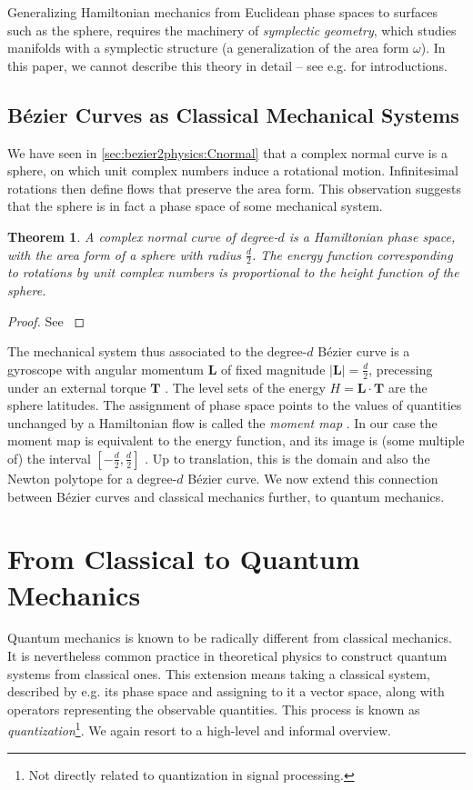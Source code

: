 \documentclass[final,3p,mathptmx]{elsarticle}
\newtheorem{theorem}{Theorem}
\begin{document}
Generalizing Hamiltonian mechanics from Euclidean phase spaces to surfaces such as the sphere, requires the machinery of \emph{symplectic geometry}, which studies manifolds with a symplectic structure (a generalization of the area form $\omega$). In this paper, we cannot describe this theory in detail  -- see e.g. \cite{mcduff2009what,arnold1990symplectic} for introductions.

\subsection{B\'{e}zier Curves as Classical Mechanical Systems}\label{sec:bezierclassical}
We have seen in \autoref{sec:bezier2physics:Cnormal} that a complex normal curve is a sphere, on which unit complex numbers induce a rotational motion. Infinitesimal rotations then define flows that preserve the area form. This observation suggests that the sphere is in fact a phase space of some mechanical system.
\begin{theorem}
	A complex normal curve of degree-$d$ is a Hamiltonian phase space, with the area form of a sphere with radius $\frac{d}{2}$. The energy function corresponding to rotations by unit complex numbers is proportional to the height function of the sphere.
\end{theorem}
\begin{proof}
	See \cite[Ch. 1.2]{da2003symplectic}
\end{proof}
The mechanical system thus associated to the degree-$d$ B\'{e}zier curve is a gyroscope with angular momentum $\mathbf{L}$ of fixed magnitude $\left| \mathbf{L} \right| = \frac{d}{2}$, precessing under  an external torque $\mathbf{T}$ \cite[Sec. 3]{stone1989supersymmetry}. The level sets of the energy $H = \mathbf{L} \cdot \mathbf{T}$ are the sphere latitudes. The assignment of phase space points to the values of quantities unchanged by a Hamiltonian flow is called the \emph{moment map} \cite{guillemin1994moment}. In our case the moment map is equivalent to the energy function, and its image is (some multiple of) the interval $[-\frac{d}{2}, \frac{d}{2}]$ \cite[Ch. 1.6]{da2003symplectic}. Up to translation, this is the domain and also the Newton polytope for a degree-$d$ B\'{e}zier curve. We now extend this connection between B\'ezier curves and classical mechanics further, to quantum mechanics.

\section{From Classical to Quantum Mechanics}\label{sec:bezierquantum}
Quantum mechanics is known to be radically different from classical mechanics. It is nevertheless common practice in theoretical physics to construct quantum systems from classical ones. This extension means taking a classical system, described by e.g. its phase space and assigning to it a vector space, along with operators representing the observable quantities. This process is known as \emph{quantization}\footnote{Not directly related to quantization in signal processing.}. We again resort to a high-level and informal overview.
\end{document}
